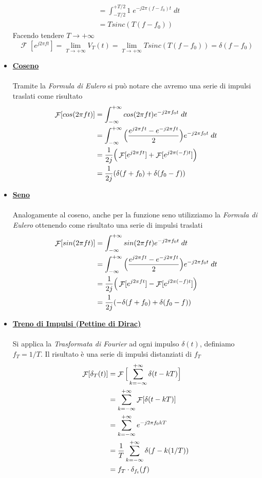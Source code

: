 \documentclass{article}
\newcommand{\Fourier}{\mathop{\mathcal{F}}}
\begin{document}
\begin{itemize}
\[\begin{aligned}
					  		&= \int_{-T/2}^{+T/2} {1\; e^{-j2\pi (f - f_0)t}\; dt} \\
							&= T sinc(T(f - f_0))
					  	\end{aligned}
					  \]
					  Facendo tendere $ T \to +\infty $
					  \[
					  	\Fourier[e^{j2\pi ft}] = \lim_{T \to +\infty} {V_T(t)} = \lim_{T \to +\infty} {T sinc(T(f - f_0))} = \delta(f - f_0)
					  \]
				\item \underline{\textbf{Coseno}} \\
					  \\
					  Tramite la \textit{Formula di Eulero} si può notare che avremo una serie di impulsi traslati come risultato
					  \[
					  	\begin{aligned}
							\Fourier[cos(2\pi f t)] &= \int_{-\infty}^{+\infty} {cos(2\pi f t) e^{-j2\pi f_0 t}\; dt} \\
							&= \int_{-\infty}^{+\infty} {\Big( {{e^{j2\pi ft}-e^{-j2\pi ft}}\over{2}} \Big) e^{-j2\pi f_0 t}\; dt} \\
							&= {1\over{2j}} \Big( \Fourier[e^{j2\pi ft}] + \Fourier[e^{j2\pi (-f)t}] \Big) \\
							&= {1\over{2j}} (\delta(f + f_0) + \delta(f_0 - f))
					  	\end{aligned}
					  \]
				\item \underline{\textbf{Seno}} \\
					  \\
					  Analogamente al coseno, anche per la funzione seno utilizziamo la \textit{Formula di Eulero} ottenendo come risultato una serie di impulsi traslati
					  \[
					  \begin{aligned}
						  \Fourier[sin(2\pi f t)] &= \int_{-\infty}^{+\infty} {sin(2\pi f t) e^{-j2\pi f_0 t}\; dt} \\
						  &= \int_{-\infty}^{+\infty} {\Big( {{e^{j2\pi ft}-e^{-j2\pi ft}}\over{2}} \Big) e^{-j2\pi f_0 t}\; dt} \\
						  &= {1\over{2j}} \Big( \Fourier[e^{j2\pi ft}] - \Fourier[e^{j2\pi (-f)t}] \Big) \\
						  &= {1\over{2j}} (-\delta(f + f_0) + \delta(f_0 - f))
					  \end{aligned}
					  \]
				\item \underline{\textbf{Treno di Impulsi (Pettine di Dirac)}} \\
					  \\
					  Si applica la \textit{Trasformata di Fourier} ad ogni impulso $ \delta(t) $, definiamo $ f_T = 1/T $. Il risultato è una serie di impulsi distanziati di $ f_T $
					  \[
					  	\begin{aligned}
							\Fourier[\delta_T(t)] &= \Fourier\Big[ \sum_{k=-\infty}^{+\infty} {\delta(t - kT)} \Big] \\
							&= \sum_{k=-\infty}^{+\infty} {\Fourier[\delta(t - kT)]} \\
							&= \sum_{k=-\infty}^{+\infty} {e^{-j2\pi f_0kT}} \\
							&= {1\over{T}} \sum_{k=-\infty}^{+\infty} {\delta(f - k(1/T))} \\
							&= f_T \cdot \delta_{f_t}(f)
					  	\end{aligned}
					  \]
			\end{itemize}
\end{document}
